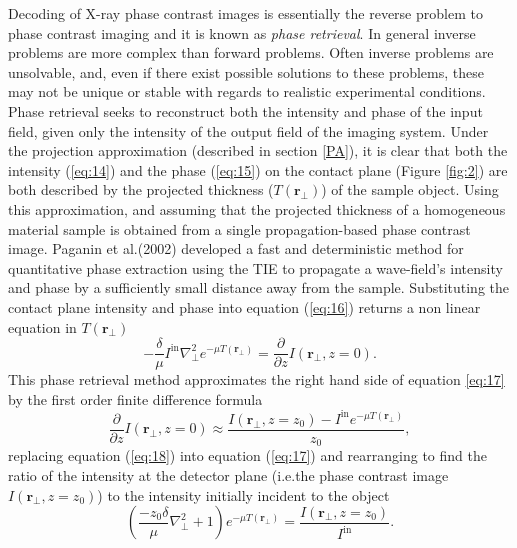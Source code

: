 \documentclass[10pt, a4paper, singlespacing]{report}
\begin{document}
Decoding of X-ray phase contrast images is essentially the reverse problem to phase contrast imaging and it is known as \textit{phase retrieval}. 
In general inverse problems are more complex than forward problems. Often inverse problems are unsolvable, and, even if there exist possible solutions to these problems, these may not be unique or stable with regards to realistic experimental conditions. 
Phase retrieval seeks to reconstruct both the intensity and phase of the input field, given only the intensity of the output field of the imaging system\cite{PagsTutes}\cite{Pags2002}. Under the projection approximation (described in section \ref{PA}), it is clear that both the intensity (\ref{eq:14}) and the phase (\ref{eq:15}) on the contact plane (Figure \ref{fig:2}) are both described by the projected thickness ($T(\mathbf{r}_{\perp})$) of the sample object. Using this approximation, and assuming that the projected thickness of a homogeneous material sample is obtained from a single propagation-based phase contrast image. Paganin et al.(2002) developed a fast and deterministic method for quantitative phase extraction\cite{Pags2002} using the TIE to propagate a wave-field's intensity and phase by a sufficiently small distance away from the sample.
Substituting the contact plane intensity and phase into equation (\ref{eq:16}) returns a non linear equation in $T(\mathbf{r}_{\perp})$
\begin{equation}\label{eq:17}
- \frac{\delta}{\mu} I^{\mathrm{in}} \nabla^{2}_{\perp} e^{-\mu T(\mathbf{r}_{\perp})} = \frac{\partial}{\partial z}I(\mathbf{r}_{\perp}, z=0).
\end{equation}
This phase retrieval method\cite{Pags2002} approximates the right hand side of equation \ref{eq:17} by the first order finite difference formula
\begin{equation}\label{eq:18}
\frac{\partial}{\partial z}I(\mathbf{r}_{\perp}, z=0) \approx \frac{I(\mathbf{r}_{\perp}, z=z_0) - I^{\mathrm{in}} e^{-\mu T(\mathbf{r}_{\perp})}}{z_0},
\end{equation}
replacing equation (\ref{eq:18}) into equation (\ref{eq:17}) and rearranging to find the ratio of the intensity at the detector plane (i.e.the phase contrast image $I(\mathbf{r}_{\perp}, z = z_0)$) to the intensity initially incident to the object
 \begin{equation}\label{eq:19}
\left (\frac{- z_0 \delta}{\mu}\nabla^{2}_{\perp} + 1 \right )e^{-\mu T(\mathbf{r}_{\perp})} = \frac{I(\mathbf{r}_{\perp}, z=z_0)}{I^{\mathrm{in}}}.
\end{equation}
\end{document}
